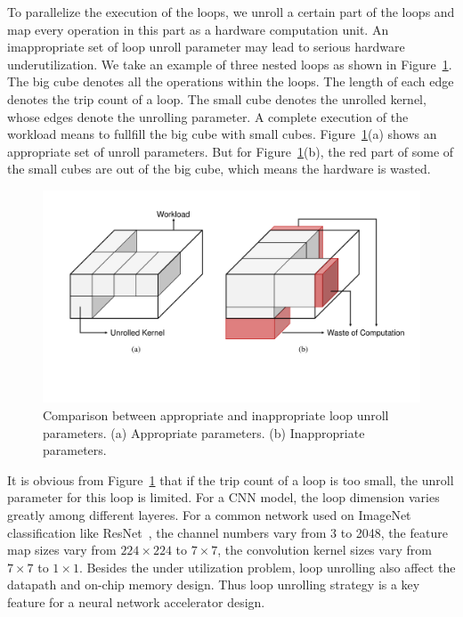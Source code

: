 To parallelize the execution of the loops, we unroll a certain part of the loops and map every operation in this part as a hardware computation unit. An imappropriate set of loop unroll parameter may lead to serious hardware underutilization. We take an example of three nested loops as shown in Figure~\ref{fig:unrolling}. The big cube denotes all the operations within the loops. The length of each edge denotes the trip count of a loop. The small cube denotes the unrolled kernel, whose edges denote the unrolling parameter. A complete execution of the workload means to fullfill the big cube with small cubes. Figure~\ref{fig:unrolling}(a) shows an appropriate set of unroll parameters. But for Figure~\ref{fig:unrolling}(b), the red part of some of the small cubes are out of the big cube, which means the hardware is wasted.

\begin{figure}[ht]
    \centering
    \includegraphics[width=0.8\columnwidth]{fig/unrolling.pdf}
    \caption{Comparison between appropriate and inappropriate loop unroll parameters. (a) Appropriate parameters. (b) Inappropriate parameters.}
    \label{fig:unrolling}
\end{figure}

It is obvious from Figure~\ref{fig:unrolling} that if the trip count of a loop is too small, the unroll parameter for this loop is limited. For a CNN model, the loop dimension varies greatly among different layeres. For a common network used on ImageNet classification like ResNet~\cite{he2016deep}, the channel numbers vary from 3 to 2048, the feature map sizes vary from $224\times 224$ to $7\times 7$, the convolution kernel sizes vary from $7\times 7$ to $1\times 1$. Besides the under utilization problem, loop unrolling also affect the datapath and on-chip memory design. Thus loop unrolling strategy is a key feature for a neural network accelerator design. 

